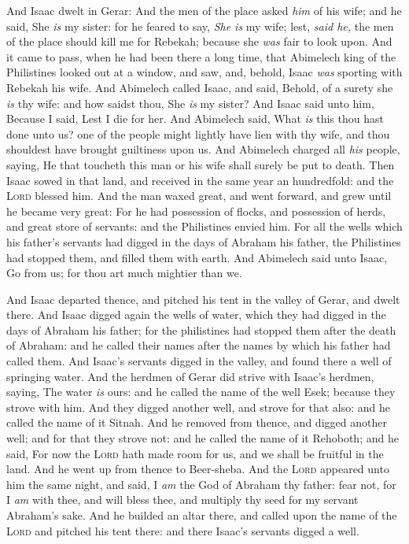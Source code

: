 \documentclass[11pt,letterpaper,oneside]{memoir}
\begin{document}
And Isaac dwelt in Gerar: And the men of the place asked \emph{him} of
his wife; and he said, She \emph{is} my sister: for he feared to say,
\emph{She is} my wife; lest, \emph{said he,} the men of the place should
kill me for Rebekah; because she \emph{was} fair to look upon. And it
came to pass, when he had been there a long time, that Abimelech king of
the Philistines looked out at a window, and saw, and, behold, Isaac
\emph{was} sporting with Rebekah his wife. And Abimelech called Isaac,
and said, Behold, of a surety she \emph{is} thy wife: and how saidst
thou, She \emph{is} my sister? And Isaac said unto him, Because I said,
Lest I die for her. And Abimelech said, What \emph{is} this thou hast
done unto us? one of the people might lightly have lien with thy wife,
and thou shouldest have brought guiltiness upon us. And Abimelech
charged all \emph{his} people, saying, He that toucheth this man or his
wife shall surely be put to death. Then Isaac sowed in that land, and
received in the same year an hundredfold: and the \textsc{Lord} blessed
him. And the man waxed great, and went forward, and grew until he became
very great: For he had possession of flocks, and possession of herds,
and great store of servants: and the Philistines envied him. For all the
wells which his father's servants had digged in the days of Abraham his
father, the Philistines had stopped them, and filled them with earth.
And Abimelech said unto Isaac, Go from us; for thou art much mightier
than we.

And Isaac departed thence, and pitched his tent in the valley of Gerar,
and dwelt there. And Isaac digged again the wells of water, which they
had digged in the days of Abraham his father; for the philistines had
stopped them after the death of Abraham: and he called their names after
the names by which his father had called them. And Isaac's servants
digged in the valley, and found there a well of springing water. And the
herdmen of Gerar did strive with Isaac's herdmen, saying, The water
\emph{is} ours: and he called the name of the well Esek; because they
strove with him. And they digged another well, and strove for that also:
and he called the name of it Sitnah. And he removed from thence, and
digged another well; and for that they strove not: and he called the
name of it Rehoboth; and he said, For now the \textsc{Lord} hath made room
for us, and we shall be fruitful in the land. And he went up from thence
to Beer-sheba. And the \textsc{Lord} appeared unto him the same night, and
said, I \emph{am} the God of Abraham thy father: fear not, for I
\emph{am} with thee, and will bless thee, and multiply thy seed for my
servant Abraham's sake. And he builded an altar there, and called upon
the name of the \textsc{Lord} and pitched his tent there: and there
Isaac's servants digged a well.
\end{document}
